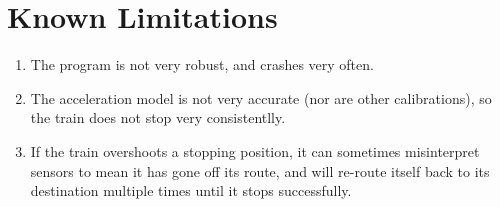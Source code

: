 \documentclass{article}
\begin{document}
\section{Known Limitations}
\begin{enumerate}
\item The program is not very robust, and crashes very often.
\item The acceleration model is not very accurate (nor are other calibrations), so the train does not stop very consistentlly.
\item If the train overshoots a stopping position, it can sometimes misinterpret sensors to mean it has gone off its route, and will re-route itself back to its destination multiple times until it stops successfully.

\end{enumerate}
\end{document}
